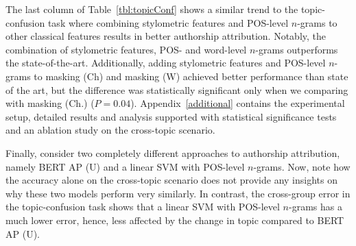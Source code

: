 \documentclass[11pt]{article}
\begin{document}



The last column of Table~\ref{tbl:topicConf} shows a similar trend to the topic-confusion task where combining stylometric features and POS-level $n$-grams to other classical features results in better authorship attribution. Notably, the combination of stylometric features, POS- and word-level $n$-grams outperforms the state-of-the-art. Additionally, adding stylometric features and POS-level $n$-grams to masking (Ch) and masking (W) achieved better performance than state of the art, but the difference was statistically significant only when we comparing with masking (Ch.) ($P=0.04$). Appendix~\ref{additional} contains the experimental setup, detailed results and analysis supported with statistical significance tests and an ablation study on the cross-topic scenario.

Finally, consider two completely different approaches to authorship attribution, namely BERT AP (U) and a linear SVM with POS-level $n$-grams. Now, note how the accuracy alone on the cross-topic scenario does not provide any insights on why these two models perform very similarly. In contrast, the cross-group error in the topic-confusion task shows that a linear SVM with POS-level $n$-grams has a much lower error, hence, less affected by the change in topic compared to BERT AP (U).
\end{document}
